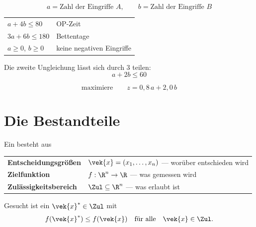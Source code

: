 \begin{merksatz}
\[ a = \text{Zahl der Eingriffe } A, \qquad b = \text{Zahl der Eingriffe } B \]

\begin{center}
\renewcommand{\arraystretch}{1.55}
\begin{tabular}{@{}P{3.2cm}P{4.8cm}@{}}
\toprule
$a + 4b \le 80$ & OP-Zeit\\
$3a + 6b \le 180$ & Bettentage\\
$a \ge 0$, $b \ge 0$ & keine negativen Eingriffe\\
\bottomrule
\end{tabular}
\end{center}

Die zweite Ungleichung lässt sich durch $3$ teilen:
\[ a + 2b \le 60 \]

\[ \text{maximiere} \qquad z = 0{,}8\,a + 2{,}0\,b \]

\begin{center}
\begin{minipage}{0.88\textwidth}
\end{minipage}
\end{center}
\end{merksatz}

\section{Die Bestandteile}

\begin{definition}
Ein  besteht aus
\begin{center}
{\small
\renewcommand{\arraystretch}{1.55}
\begin{tabular}{@{}P{3.4cm}P{5.2cm}@{}}
\toprule
\textbf{Entscheidungs\-größen} & $\vek{x} = (x_1,\ldots,x_n)$ --- worüber entschieden wird\\
\textbf{Zielfunktion} & $f: \R^n \to \R$ --- was gemessen wird\\
\textbf{Zulässigkeitsbereich} & $\Zul \subseteq \R^n$ --- was erlaubt ist\\
\bottomrule
\end{tabular}}
\end{center}
Gesucht ist ein $\vek{x}^{*} \in \Zul$ mit
\[ f(\vek{x}^{*}) \le f(\vek{x}) \quad\text{für alle}\quad \vek{x} \in \Zul . \]
\end{definition}

